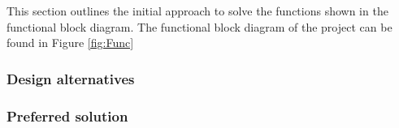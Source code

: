 This section outlines the initial approach to solve the functions shown in the functional block diagram. The functional block diagram of the project can be found in Figure \ref{fig:Func}
\subsubsection{Design alternatives}

\subsubsection{Preferred solution}

